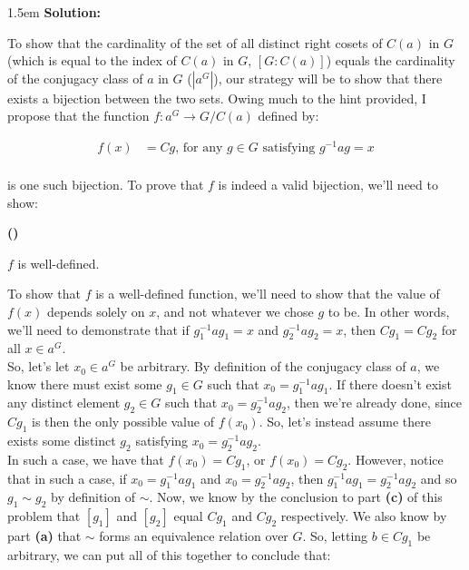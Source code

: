 \documentclass{article}
\newenvironment{solution}{
	\vspace{.5em}
	\par
	\begin{adjustwidth}{1.5em}{}
	\textbf{{Solution:}}
	\par
	\vspace{.5em}
}{
	\vspace{1em}
	\end{adjustwidth}
	\setcounter{step}{0}
	\newpage
}
\newcounter{step}
\renewcommand{\thestep}{\Roman{step}}
\newenvironment{step}{
	\refstepcounter{step}
	\vspace{1em}\par\noindent
	\ignorespaces\noindent\textbf{(\thestep)}
	\ignorespaces
}{
	\par
	\vspace{1.5em}
}
\newcounter{problem}
\begin{document}
\begin{solution}
	To show that the cardinality of the set of all distinct right cosets of $C(a)$ in $G$ (which is equal to the index of $C(a)$ in $G$, $[G \colon C(a)]$) equals the cardinality of the conjugacy class of $a$ in $G$ ($|a^{G}|$), our strategy will be to show that there exists a bijection between the two sets. Owing much to the hint provided, I propose that the function $f \colon a^{G} \rightarrow G/C(a)$ defined by:

	\begin{align*}
		f(x) &= Cg \text{, for any } g \in G \text{ satisfying } g^{-1}ag = x \\
	\end{align*}

	is one such bijection. To prove that $f$ is indeed a valid bijection, we'll need to show:

	\begin{step}
		$f$ is well-defined.
	\end{step}

	To show that $f$ is a well-defined function, we'll need to show that the value of $f(x)$ depends solely on $x$, and not whatever we chose $g$ to be. In other words, we'll need to demonstrate that if $g_{1}^{-1}ag_{1} = x$ and $g_{2}^{-1}ag_{2} = x$, then $Cg_{1} = Cg_{2}$ for all $x \in a^{G}$. \\

	So, let's let $x_{0} \in a^{G}$ be arbitrary. By definition of the conjugacy class of $a$, we know there must exist some $g_{1} \in G$ such that $x_{0} = g_{1}^{-1}ag_{1}$. If there doesn't exist any distinct element $g_{2} \in G$ such that $x_{0} = g_{2}^{-1}ag_{2}$, then we're already done, since $Cg_{1}$ is then the only possible value of $f(x_{0})$. So, let's instead assume there exists some distinct $g_{2}$ satisfying $x_{0} = g_{2}^{-1}ag_{2}$. \\

	In such a case, we have that $f(x_{0}) = Cg_{1}$, or $f(x_{0}) = Cg_{2}$. However, notice that in such a case, if $x_{0} = g_{1}^{-1}ag_{1}$ and $x_{0} = g_{2}^{-1}ag_{2}$, then $g_{1}^{-1}ag_{1} = g_{2}^{-1}ag_{2}$ and so $g_{1} \sim g_{2}$ by definition of $\sim$. Now, we know by the conclusion to part \textbf{(c)} of this problem that $[g_{1}]$ and $[g_{2}]$ equal $Cg_{1}$ and $Cg_{2}$ respectively. We also know by part \textbf{(a)} that $\sim$ forms an equivalence relation over $G$. So, letting $b \in Cg_{1}$ be arbitrary, we can put all of this together to conclude that:


\end{solution}
\end{document}
